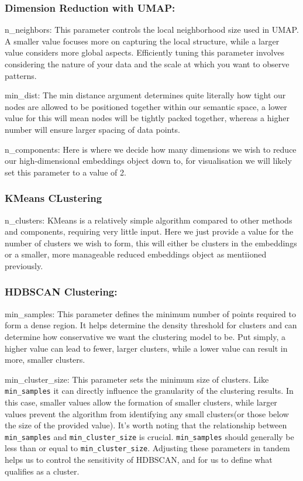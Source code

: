 \documentclass[
  letterpaper,
  DIV=11,
  numbers=noendperiod]{scrreprt}
\begin{document}
\subsubsection{Dimension Reduction with
UMAP:}\label{dimension-reduction-with-umap}

n\_neighbors: This parameter controls the local neighborhood size used
in UMAP. A smaller value focuses more on capturing the local structure,
while a larger value considers more global aspects. Efficiently tuning
this parameter involves considering the nature of your data and the
scale at which you want to observe patterns.

min\_dist: The min distance argument determines quite literally how
tight our nodes are allowed to be positioned together within our
semantic space, a lower value for this will mean nodes will be tightly
packed together, whereas a higher number will ensure larger spacing of
data points.

n\_components: Here is where we decide how many dimensions we wish to
reduce our high-dimensional embeddings object down to, for visualisation
we will likely set this parameter to a value of 2.

\subsubsection{KMeans CLustering}\label{kmeans-clustering}

n\_clusters: KMeans is a relatively simple algorithm compared to other
methods and components, requiring very little input. Here we just
provide a value for the number of clusters we wish to form, this will
either be clusters in the embeddings or a smaller, more manageable
reduced embeddings object as mentiioned previously.

\subsubsection{HDBSCAN Clustering:}\label{hdbscan-clustering}

min\_samples: This parameter defines the minimum number of points
required to form a dense region. It helps determine the density
threshold for clusters and can determine how conservative we want the
clustering model to be. Put simply, a higher value can lead to fewer,
larger clusters, while a lower value can result in more, smaller
clusters.

min\_cluster\_size: This parameter sets the minimum size of clusters.
Like \texttt{min\_samples} it can directly influence the granularity of
the clustering results. In this case, smaller values allow the formation
of smaller clusters, while larger values prevent the algorithm from
identifying any small clusters(or those below the size of the provided
value). It's worth noting that the relationship between
\texttt{min\_samples} and \texttt{min\_cluster\_size} is crucial.
\texttt{min\_samples} should generally be less than or equal to
\texttt{min\_cluster\_size}. Adjusting these parameters in tandem helps
us to control the sensitivity of HDBSCAN, and for us to define what
qualifies as a cluster.
\end{document}
